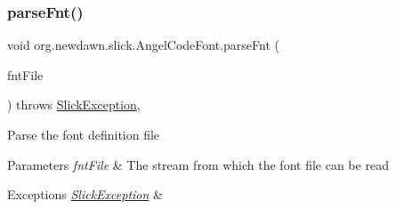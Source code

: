 \subsubsection{\texorpdfstring{parse\+Fnt()}{parseFnt()}}
{\footnotesize\ttfamily void org.\+newdawn.\+slick.\+Angel\+Code\+Font.\+parse\+Fnt (\begin{DoxyParamCaption}\item[{Input\+Stream}]{fnt\+File }\end{DoxyParamCaption}) throws \mbox{\hyperlink{classorg_1_1newdawn_1_1slick_1_1_slick_exception}{Slick\+Exception}}\hspace{0.3cm}{\ttfamily [inline]}, {\ttfamily [private]}}

Parse the font definition file


\begin{DoxyParams}{Parameters}
{\em fnt\+File} & The stream from which the font file can be read \\
\hline
\end{DoxyParams}

\begin{DoxyExceptions}{Exceptions}
{\em \mbox{\hyperlink{classorg_1_1newdawn_1_1slick_1_1_slick_exception}{Slick\+Exception}}} & \\
\hline
\end{DoxyExceptions}

